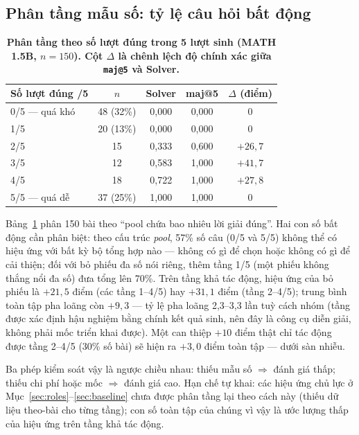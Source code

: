\documentclass[12pt,a4paper]{article}
\begin{document}
\subsection{Phân tầng mẫu số: tỷ lệ câu hỏi bất động}\label{sec:denominator}

\begin{table}[h]\centering\small
\begin{tabular}{@{}l c c c c@{}}
\toprule
Số lượt đúng /5 & \(n\) & Solver & maj@5 & \(\Delta\) (điểm)\\
\midrule
0/5 --- quá khó & 48 (32\%) & 0,000 & 0,000 & 0\\
1/5 & 20 (13\%) & 0,000 & 0,000 & 0\\
2/5 & 15 & 0,333 & 0,600 & \(+26{,}7\)\\
3/5 & 12 & 0,583 & 1,000 & \(+41{,}7\)\\
4/5 & 18 & 0,722 & 1,000 & \(+27{,}8\)\\
5/5 --- quá dễ & 37 (25\%) & 1,000 & 1,000 & 0\\
\bottomrule
\end{tabular}
\caption{\textbf{Phân tầng theo số lượt đúng trong 5 lượt sinh (MATH 1.5B, \(n=150\)). Cột \(\Delta\) là chênh lệch độ chính xác giữa \texttt{maj@5} và Solver.}}
\label{tab:strata}
\end{table}

Bảng~\ref{tab:strata} phân 150 bài theo ``pool chứa bao nhiêu lời giải đúng''. Hai con số bất động cần phân biệt: theo cấu trúc \textit{pool}, 57\% số câu (0/5 và 5/5) không thể có hiệu ứng với bất kỳ bộ tổng hợp nào --- không có gì để chọn hoặc không có gì để cải thiện; đối với bỏ phiếu đa số nói riêng, thêm tầng 1/5 (một phiếu không thắng nổi đa số) đưa tổng lên 70\%. Trên tầng khả tác động, hiệu ứng của bỏ phiếu là \(+21{,}5\) điểm (các tầng 1--4/5) hay \(+31{,}1\) điểm (tầng 2--4/5); trung bình toàn tập pha loãng còn \(+9{,}3\) --- tỷ lệ pha loãng 2,3--3,3 lần tuỳ cách nhóm (tầng được xác định hậu nghiệm bằng chính kết quả sinh, nên đây là công cụ diễn giải, không phải mốc triển khai được). Một can thiệp \(+10\) điểm thật chỉ tác động được tầng 2--4/5 (30\% số bài) sẽ hiện ra \(+3{,}0\) điểm toàn tập --- dưới sàn nhiễu.

Ba phép kiểm soát vậy là ngược chiều nhau: thiếu mẫu số \(\Rightarrow\) đánh giá thấp; thiếu chi phí hoặc mốc \(\Rightarrow\) đánh giá cao. Hạn chế tự khai: các hiệu ứng chủ lực ở Mục~\ref{sec:roles}--\ref{sec:baseline} chưa được phân tầng lại theo cách này (thiếu dữ liệu theo-bài cho từng tầng); con số toàn tập của chúng vì vậy là ước lượng thấp của hiệu ứng trên tầng khả tác động.
\end{document}
